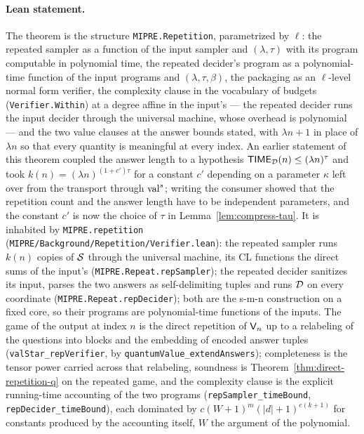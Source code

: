 \paragraph{Lean statement.} The theorem is the structure \texttt{MIPRE.Repetition},
parametrized by $\ell$: the repeated sampler as a function of the input sampler and
$(\lambda, \tau)$ with its program computable in polynomial time, the repeated decider's
program as a polynomial-time function of the input programs and $(\lambda, \tau, \beta)$,
the packaging as an $\ell$-level normal form verifier, the complexity clause in the
vocabulary of budgets (\texttt{Verifier.Within}) at a degree affine in the input's --- the
repeated decider runs the input decider through the universal machine, whose overhead is
polynomial --- and the two value clauses at the answer bounds stated, with $\lambda n + 1$ in
place of $\lambda n$ so that every quantity is meaningful at every index. An earlier
statement of this theorem coupled the answer length to a hypothesis $\mathsf{TIME}_{\mathcal{D}}(n) \leq
(\lambda n)^\tau$ and took $k(n) = (\lambda n)^{(1 + c')\tau}$ for a constant $c'$ depending
on a parameter $\kappa$ left over from the transport through $\mathrm{val}^{s}$; writing the consumer
showed that the repetition count and the answer length have to be independent parameters,
and the constant $c'$ is now the choice of $\tau$ in Lemma~\ref{lem:compress-tau}. It is
inhabited by \texttt{MIPRE.repetition} (\texttt{MIPRE/Background/Repetition/Verifier.lean}):
the repeated sampler runs $k(n)$ copies of $\mathcal{S}$ through the universal machine, its CL
functions the direct sums of the input's (\texttt{MIPRE.Repeat.repSampler}); the repeated
decider sanitizes its input, parses the two answers as self-delimiting tuples and runs
$\mathcal{D}$ on every coordinate (\texttt{MIPRE.Repeat.repDecider}); both are the s-m-n
construction on a fixed core, so their programs are polynomial-time functions of the inputs.
The game of the output at index $n$ is the direct repetition of $\mathsf{V}_n$ up to a
relabeling of the questions into blocks and the embedding of encoded answer tuples
(\texttt{valStar\_repVerifier}, by \texttt{quantumValue\_extendAnswers}); completeness is the
tensor power carried across that relabeling, soundness is
Theorem~\ref{thm:direct-repetition-q} on the repeated game, and the complexity clause is
the explicit running-time accounting of the two programs (\texttt{repSampler\_timeBound},
\texttt{repDecider\_timeBound}), each dominated by $c (W + 1)^m (|d| + 1)^{e (k + 1)}$ for
constants produced by the accounting itself, $W$ the argument of the polynomial.

